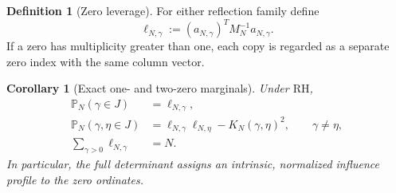\documentclass[preprint,12pt]{elsarticle}
\numberwithin{equation}{section}
\theoremstyle{plain}
\newtheorem{corollary}[theorem]{Corollary}
\theoremstyle{definition}
\newtheorem{definition}[theorem]{Definition}
\theoremstyle{remark}
\newcommand{\RH}{\mathrm{RH}}
\begin{document}
\begin{definition}[Zero leverage]
\label{def:zero_leverage}
For either reflection family define
\begin{equation}
\ell_{N,\gamma}:=(a_{N,\gamma})^TM_N^{-1}a_{N,\gamma}.
\label{eq:zero_leverage}
\end{equation}
If a zero has multiplicity greater than one, each copy is regarded as a separate zero index with the same column vector.
\end{definition}

\begin{corollary}[Exact one- and two-zero marginals]
\label{cor:zero_marginals}
Under $\RH$,
\begin{align}
\mathbb P_N(\gamma\in J)&=\ell_{N,\gamma},
\label{eq:one_zero_marginal}\\
\mathbb P_N(\gamma,\eta\in J)
&=\ell_{N,\gamma}\ell_{N,\eta}-K_N(\gamma,\eta)^2,
\qquad \gamma\ne\eta,
\label{eq:two_zero_marginal}\\
\sum_{\gamma>0}\ell_{N,\gamma}&=N.
\label{eq:total_leverage_N}
\end{align}
In particular, the full determinant assigns an intrinsic, normalized influence profile to the zero ordinates.
\end{corollary}
\end{document}
